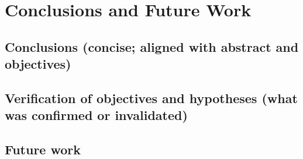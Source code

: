 \chapter{Conclusions and Future Work}\label{chap:conclusions}

\section{Conclusions (concise; aligned with abstract and objectives)}\label{sec:conclusions}

\section{Verification of objectives and hypotheses (what was confirmed or invalidated)}\label{sec:verification}

\section{Future work}\label{sec:future-work}